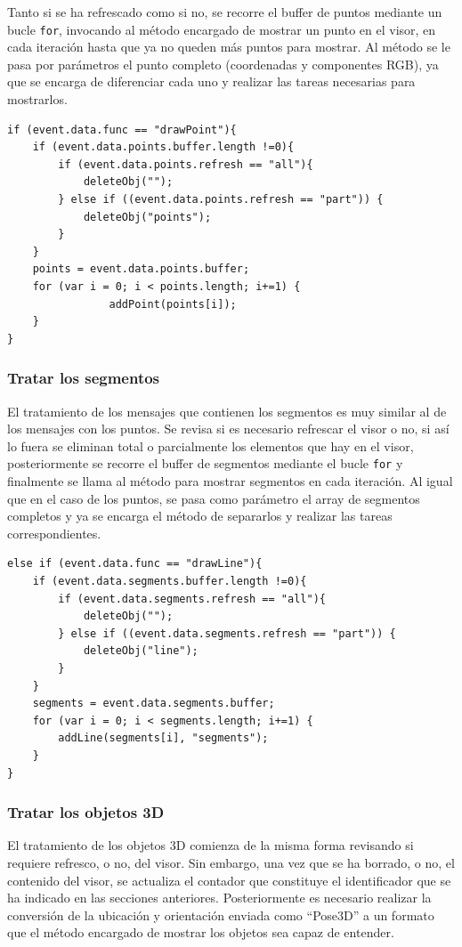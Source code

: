 Tanto si se ha refrescado como si no, se recorre el buffer de puntos mediante un bucle \texttt{for}, invocando al método encargado de mostrar un punto en el visor, en cada iteración hasta que ya no queden más puntos para mostrar. Al método se le pasa por parámetros el punto completo (coordenadas y componentes RGB), ya que se encarga de diferenciar cada uno y realizar las tareas necesarias para mostrarlos. 

\begin{lstlisting}[caption= Código para tratar los mensajes con los puntos, label=cod.tratarpuntos]
if (event.data.func == "drawPoint"){
	if (event.data.points.buffer.length !=0){
		if (event.data.points.refresh == "all"){
			deleteObj("");
		} else if ((event.data.points.refresh == "part")) {
			deleteObj("points");
		}
	}
	points = event.data.points.buffer;
	for (var i = 0; i < points.length; i+=1) {
        		addPoint(points[i]);
	}
}
 \end{lstlisting}

\subsubsection{Tratar los segmentos}
El tratamiento de los mensajes que contienen los segmentos es muy similar al de los mensajes con los puntos. Se revisa si es necesario refrescar el visor o no, si así lo fuera se eliminan total o parcialmente los elementos que hay en el visor, posteriormente se recorre el buffer de segmentos mediante el bucle \texttt{for} y finalmente se llama al método para mostrar segmentos en cada iteración. Al igual que en el caso de los puntos, se pasa como parámetro el array de segmentos completos y ya se encarga el método de separarlos y realizar las tareas correspondientes.

\begin{lstlisting}[caption= Código para tratar los mensajes con los segmentos, label=cod.tratarsegmentos]
else if (event.data.func == "drawLine"){
	if (event.data.segments.buffer.length !=0){
		if (event.data.segments.refresh == "all"){
			deleteObj("");
		} else if ((event.data.segments.refresh == "part")) {
			deleteObj("line");
		}
	}
	segments = event.data.segments.buffer;
	for (var i = 0; i < segments.length; i+=1) {
		addLine(segments[i], "segments");
	}
}
\end{lstlisting}

\subsubsection{Tratar los objetos 3D}
El tratamiento de los objetos 3D comienza de la misma forma revisando si requiere refresco, o no, del visor. Sin embargo, una vez que se ha borrado, o no, el contenido del visor, se actualiza el contador que constituye el identificador que se ha indicado en las secciones anteriores. Posteriormente es necesario realizar la conversión de la ubicación y orientación enviada como ``Pose3D'' a un formato que el método encargado de mostrar los objetos sea capaz de entender.


